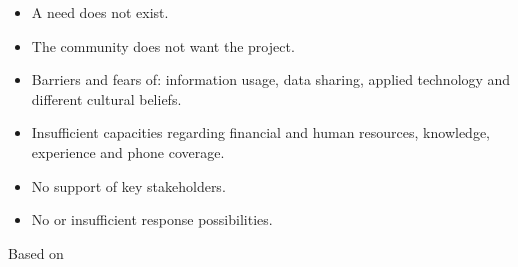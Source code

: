 \begin{itemize}
    \item A need does not exist.
    \item The community does not want the project.
    \item Barriers and fears of: information usage, data sharing, applied technology and different cultural beliefs.
    \item Insufficient capacities regarding financial and human resources, knowledge, experience and phone coverage.
    \item No support of key stakeholders.
    \item No or insufficient response possibilities.
\end{itemize}
\hfill {\footnotesize Based on \textcite{ifrcCommunityBasedSurveillanceGuiding2017}}

